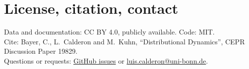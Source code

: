 \documentclass[11pt]{article}
\begin{document}
\section{License, citation, contact}

Data and documentation: CC BY 4.0, publicly available. Code: MIT.\\
Cite: Bayer, C., L.\ Calderon and M.\ Kuhn, ``Distributional Dynamics'', CEPR Discussion Paper 19829.\\
Questions or requests: \href{https://github.com/LuisCald/DD_data/issues}{GitHub issues} or
\href{mailto:luis.calderon@uni-bonn.de}{luis.calderon@uni-bonn.de}.
\end{document}
